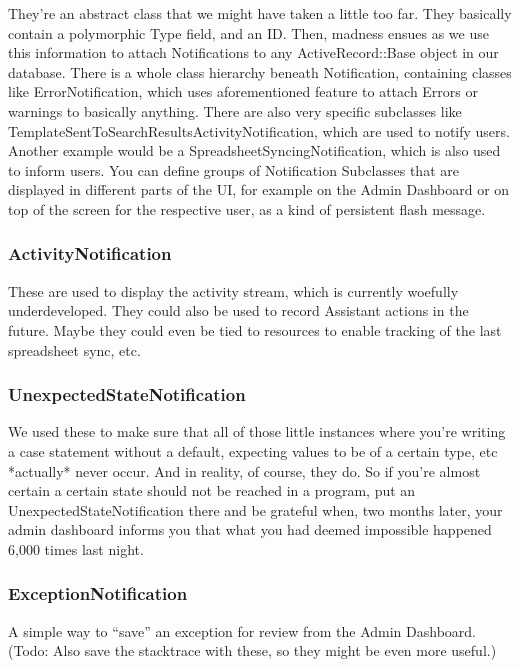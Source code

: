 They’re an abstract class that we might have taken a little too far. They basically contain a polymorphic Type field, and an ID. Then, madness ensues as we use this information to attach Notifications to any ActiveRecord::Base object in our database. There is a whole class hierarchy beneath Notification, containing classes like ErrorNotification, which uses aforementioned feature to attach Errors or warnings to basically anything. There are also very specific subclasses like TemplateSentToSearchResultsActivityNotification, which are used to notify users. Another example would be a SpreadsheetSyncingNotification, which is also used to inform users. You can define groups of Notification Subclasses that are displayed in different parts of the UI, for example on the Admin Dashboard or on top of the screen for the respective user, as a kind of persistent flash message.

\subsubsection{ActivityNotification}

These are used to display the activity stream, which is currently woefully underdeveloped.
They could also be used to record Assistant actions in the future. Maybe they could even be tied to resources to enable tracking of the last spreadsheet sync, etc.

\subsubsection{UnexpectedStateNotification}

We used these to make sure that all of those little instances where you’re writing a case statement without a default, expecting values to be of a certain type, etc *actually* never occur. And in reality, of course, they do. So if you’re almost certain a certain state should not be reached in a program, put an UnexpectedStateNotification there and be grateful when, two months later, your admin dashboard informs you that what you had deemed impossible happened 6,000 times last night.

\subsubsection{ExceptionNotification}

A simple way to “save” an exception for review from the Admin Dashboard. (Todo: Also save the stacktrace with these, so they might be even more useful.)

